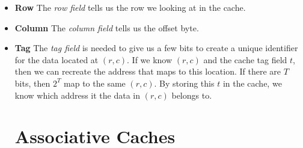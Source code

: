 \begin{itemize}	
\renewcommand{\labelitemi}{$\Box$}
\item \textbf{Row} The \textit{row field} tells us the row we looking at in the cache. 
\item \textbf{Column} The \textit{column field} tells us the offset byte.
\item \textbf{Tag} The \textit{tag field} is needed to give us a few bits to create a unique
identifier for the data located at $(r,c)$. If we know $(r,c)$ and the cache tag field $t$,
then we can recreate the address that maps to this location. If there are $T$ bits, 
then $2^{T}$ map to the same $(r,c)$. By storing this $t$ in the cache, 
we know which address it the data in $(r,c)$ belongs to.




\section{Associative Caches}


\begin{figure}[h]
\end{figure} 




\end{itemize}